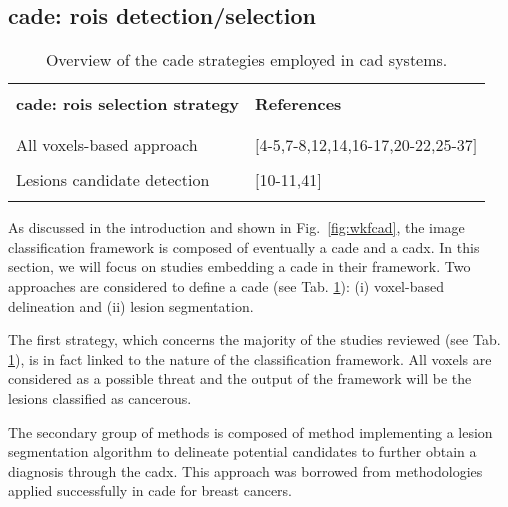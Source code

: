 \subsection{\ac{cade}: \acp{roi} detection/selection}

\begin{table}
	\caption{Overview of the \ac{cade} strategies employed in \ac{cad} systems.}
	\small
	\begin{tabular}{p{.65\linewidth} p{.25\linewidth}}
		\hline \\ [-1.5ex]
		\textbf{\ac{cade}: \acp{roi} selection strategy} & \textbf{References} \\ \\ [-1.5ex]
		\hline \\ [-1.5ex]
		\quad All voxels-based approach & $[$4-5,7-8,12,14,16-17,20-22,25-37$]$ \\ \\ [-1.5ex]
		\quad Lesions candidate detection & $[$10-11,41$]$ \\ \\ [-1.5ex]
		\hline
	\end{tabular}
	\label{tab:cade}
\end{table}

As discussed in the introduction and shown in Fig.~\ref{fig:wkfcad}, the image classification framework is composed of eventually a \ac{cade} and a \ac{cadx}. In this section, we will focus on studies embedding a \ac{cade} in their framework. Two approaches are considered to define a \ac{cade} (see Tab. \ref{tab:cade}): (i) voxel-based delineation and (ii) lesion segmentation.

The first strategy, which concerns the majority of the studies reviewed (see Tab. \ref{tab:cade}), is in fact linked to the nature of the classification framework. All voxels are considered as a possible threat and the output of the framework will be the lesions classified as cancerous.

The secondary group of methods is composed of method implementing a lesion segmentation algorithm to delineate potential candidates to further obtain a diagnosis through the \ac{cadx}. This approach was borrowed from methodologies applied successfully in \ac{cade} for breast cancers.

